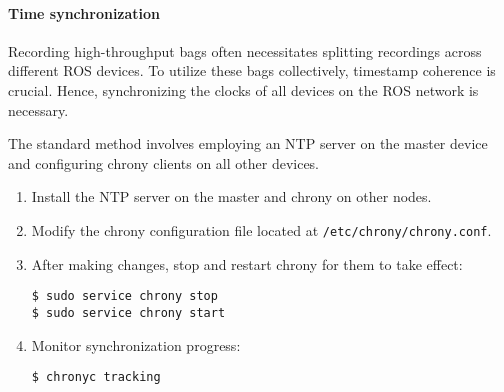 \paragraph*{Time synchronization}
Recording high-throughput bags often necessitates splitting recordings across different ROS devices. 
To utilize these bags collectively, timestamp coherence is crucial. 
Hence, synchronizing the clocks of all devices on the ROS network is necessary.

The standard method involves employing an NTP server on the master device and configuring chrony clients on all other devices.
\begin{enumerate}
    \item Install the NTP server on the master and chrony on other nodes.
    \item Modify the chrony configuration file located at \texttt{/etc/chrony/chrony.conf}.
    \item After making changes, stop and restart chrony for them to take effect:
\begin{verbatim}
$ sudo service chrony stop
$ sudo service chrony start
\end{verbatim}
    \item Monitor synchronization progress:
\begin{verbatim}
$ chronyc tracking
\end{verbatim}
\end{enumerate}